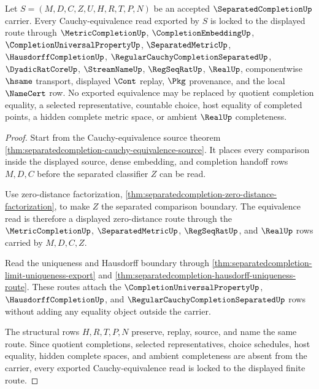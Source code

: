 \begin{theorem}
\label{thm:separated-completion-cauchy-sequence-equivalence-lock}
Let $S=(M,D,C,Z,U,H,R,T,P,N)$ be an accepted $\SeparatedCompletionUp$ carrier. Every Cauchy-equivalence read exported by $S$ is locked to the displayed route through $\MetricCompletionUp$, $\CompletionEmbeddingUp$, $\CompletionUniversalPropertyUp$, $\SeparatedMetricUp$, $\HausdorffCompletionUp$, $\RegularCauchyCompletionSeparatedUp$, $\DyadicRatCoreUp$, $\StreamNameUp$, $\RegSeqRatUp$, $\RealUp$, componentwise $\hsame$ transport, displayed $\Cont$ replay, $\Pkg$ provenance, and the local $\NameCert$ row. No exported equivalence may be replaced by quotient completion equality, a selected representative, countable choice, host equality of completed points, a hidden complete metric space, or ambient $\RealUp$ completeness.
\end{theorem}
\begin{proof}
Start from the Cauchy-equivalence source theorem \autoref{thm:separatedcompletion-cauchy-equivalence-source}. It places every comparison inside the displayed source, dense embedding, and completion handoff rows $M,D,C$ before the separated classifier $Z$ can be read.

Use zero-distance factorization, \autoref{thm:separatedcompletion-zero-distance-factorization}, to make $Z$ the separated comparison boundary. The equivalence read is therefore a displayed zero-distance route through the $\MetricCompletionUp$, $\SeparatedMetricUp$, $\RegSeqRatUp$, and $\RealUp$ rows carried by $M,D,C,Z$.

Read the uniqueness and Hausdorff boundary through \autoref{thm:separatedcompletion-limit-uniqueness-export} and \autoref{thm:separatedcompletion-hausdorff-uniqueness-route}. These routes attach the $\CompletionUniversalPropertyUp$, $\HausdorffCompletionUp$, and $\RegularCauchyCompletionSeparatedUp$ rows without adding any equality object outside the carrier.

The structural rows $H,R,T,P,N$ preserve, replay, source, and name the same route. Since quotient completions, selected representatives, choice schedules, host equality, hidden complete spaces, and ambient completeness are absent from the carrier, every exported Cauchy-equivalence read is locked to the displayed finite route.
\end{proof}

